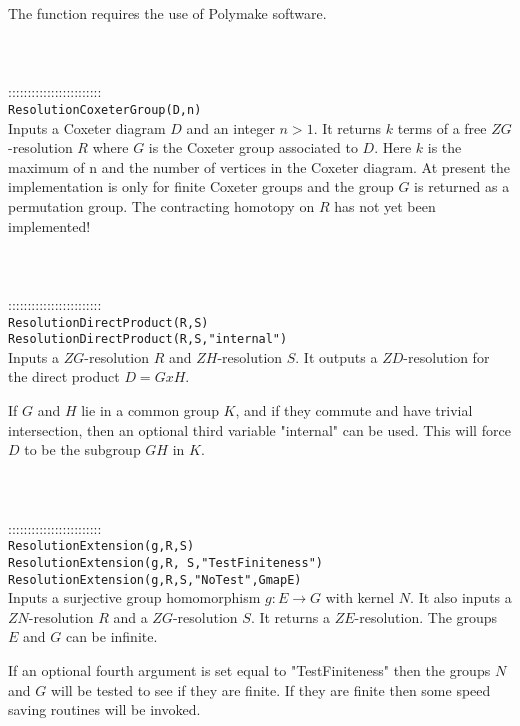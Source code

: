 \documentclass[a4paper,11pt]{report}
\begin{document}
{ The function requires the use of Polymake software. \\
 \\
 \\
 \\
 ::::::::::::::::::::::::\\
 \texttt{ResolutionCoxeterGroup(D,n)}\\
 

 Inputs a Coxeter diagram $D$ and an integer $n>1$. It returns $k$ terms of a free $ZG$-resolution $R$ where $G$ is the Coxeter group associated to $D$. Here $k$ is the maximum of n and the number of vertices in the Coxeter diagram. At
present the implementation is only for finite Coxeter groups and the group $G$ is returned as a permutation group. The contracting homotopy on $R$ has not yet been implemented! \\
 \\
 \\
 \\
 ::::::::::::::::::::::::\\
 \texttt{ResolutionDirectProduct(R,S) }\\
 \texttt{ResolutionDirectProduct(R,S,"internal")}\\
 

 Inputs a $ZG$-resolution $R$ and $ZH$-resolution $S$. It outputs a $ZD$-resolution for the direct product $D=G x H$.

 If $G$ and $H$ lie in a common group $K$, and if they commute and have trivial intersection, then an optional third
variable "internal" can be used. This will force $D$ to be the subgroup $GH$ in $K$. \\
 \\
 \\
 \\
 ::::::::::::::::::::::::\\
 \texttt{ResolutionExtension(g,R,S) }\\
 \texttt{ResolutionExtension(g,R, S,"TestFiniteness")}\\
 \texttt{ResolutionExtension(g,R,S,"NoTest",GmapE)}\\
 

 Inputs a surjective group homomorphism $g:E \longrightarrow G$ with kernel $N$. It also inputs a $ZN$-resolution $R$ and a $ZG$-resolution $S$. It returns a $ZE$-resolution. The groups $E$ and $G$ can be infinite.

 If an optional fourth argument is set equal to "TestFiniteness" then the
groups $N$ and $G$ will be tested to see if they are finite. If they are finite then some speed
saving routines will be invoked.

}
\end{document}
